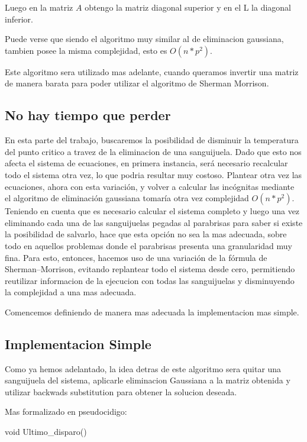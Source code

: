 Luego en la matriz $A$ obtengo la matriz diagonal superior y en el L la diagonal inferior.

Puede verse que siendo el algoritmo muy similar al de eliminacion gaussiana, tambien posee la misma complejidad, esto es $O(n*p^2)$.

Este algoritmo sera utilizado mas adelante, cuando queramos invertir una matriz de manera barata para poder utilizar el algoritmo de Sherman Morrison.

\subsection{No hay tiempo que perder}

En esta parte del trabajo, buscaremos la posibilidad de disminuir la temperatura del punto critico a travez de la eliminacion de una sanguijuela. Dado que esto nos afecta el sistema de ecuaciones, en primera instancia, ser\'a necesario recalcular todo el sistema otra vez, lo que podria resultar muy costoso. Plantear otra vez las ecuaciones, ahora con esta variaci\'on, y volver a calcular las inc\'ognitas mediante el algoritmo de eliminaci\'on gaussiana tomar\'ia otra vez complejidad $O(n*p^2)$. Teniendo en cuenta que es necesario calcular el sistema completo y luego una vez eliminando cada una de las sanguijuelas pegadas al parabrisas para saber si existe la posibilidad de salvarlo, hace que esta opci\'on no sea la mas adecuada, sobre todo en aquellos problemas donde el parabrisas presenta una granularidad muy fina. Para esto, entonces, hacemos uso de una variaci\'on de la f\'ormula de Sherman–Morrison, evitando replantear todo el sistema desde cero, permitiendo reutilizar informacion de la ejecucion con todas las sanguijuelas y disminuyendo la complejidad a una mas adecuada.

Comencemos definiendo de manera mas adecuada la implementacion mas simple.

\subsection{Implementacion Simple}

Como ya hemos adelantado, la idea detras de este algoritmo sera quitar una sanguijuela del sistema, aplicarle eliminacion Gaussiana a la matriz obtenida y utilizar backwads substitution para obtener la solucion deseada.

Mas formalizado en pseudocidigo:

\begin{algorithm}
\begin{algorithmic}[1]\parskip=1mm
\caption{void Ultimo\_disparo()}
\end{algorithmic}
\end{algorithm}

